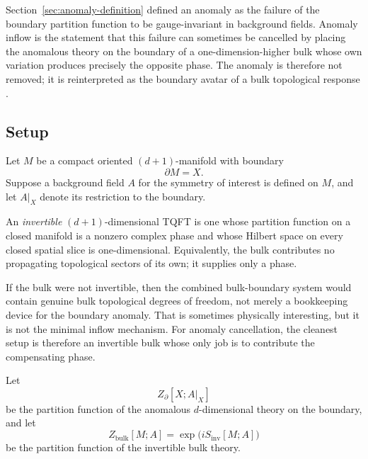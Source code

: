Section~\ref{sec:anomaly-definition} defined an anomaly as the failure of the boundary partition function to be gauge-invariant in background fields. Anomaly inflow is the statement that this failure can sometimes be cancelled by placing the anomalous theory on the boundary of a one-dimension-higher bulk whose own variation produces precisely the opposite phase. The anomaly is therefore not removed; it is reinterpreted as the boundary avatar of a bulk topological response \cite{CallanHarvey1985,Freed1995CSnotes,FreedMooreTeleman2024}.

\subsection{Setup}

\begin{assumption}\label{ass:inflow-setup}
Let $M$ be a compact oriented $(d+1)$-manifold with boundary
\begin{equation*}
\partial M = X.
\end{equation*}
Suppose a background field $A$ for the symmetry of interest is defined on $M$, and let $A|_X$ denote its restriction to the boundary.
\end{assumption}

\begin{definition}\label{def:invertible-bulk}
An \emph{invertible} $(d+1)$-dimensional TQFT is one whose partition function on a closed manifold is a nonzero complex phase and whose Hilbert space on every closed spatial slice is one-dimensional. Equivalently, the bulk contributes no propagating topological sectors of its own; it supplies only a phase.
\end{definition}

\begin{remark}\label{rem:invertible-why}
If the bulk were not invertible, then the combined bulk-boundary system would contain genuine bulk topological degrees of freedom, not merely a bookkeeping device for the boundary anomaly. That is sometimes physically interesting, but it is not the minimal inflow mechanism. For anomaly cancellation, the cleanest setup is therefore an invertible bulk whose only job is to contribute the compensating phase.
\end{remark}

\noindent Let
\begin{equation*}
Z_{\partial}[X;A|_X]
\end{equation*}
be the partition function of the anomalous $d$-dimensional theory on the boundary, and let
\begin{equation*}
Z_{\mathrm{bulk}}[M;A]
=
\exp\!\bigl(iS_{\mathrm{inv}}[M;A]\bigr)
\end{equation*}
be the partition function of the invertible bulk theory.

